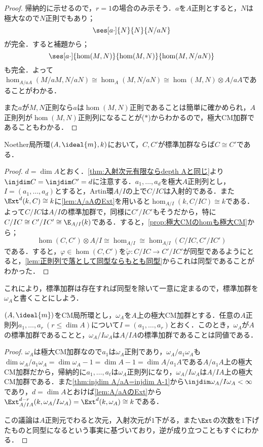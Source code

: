 \begin{proof}
	帰納的に示せるので，$r=1$の場合のみ示そう．$a$を$A$正則とすると，$N$は極大なので$N$正則でもあり；
	\[\ses[a\cdot]{N}{N}{N/aN}\]
	が完全．すると補題から；
	\[\ses[a\cdot]{\hom(M,N)}{\hom(M,N)}{\hom(M,N/aN)}\]
	も完全．よって$\hom_{A/aA}(M/aM,N/aN)\cong\hom_A(M,N/aN)\cong\hom(M,N)\otimes A/aA$であることがわかる．
	
	また$a$が$M,N$正則なら$a$は$\hom(M,N)$正則であることは簡単に確かめられ，$A$正則列が$\hom(M,N)$正則列になることが($\ast$)からわかるので，極大CM加群であることもわかる．
\end{proof}

\begin{thm}
	Noether局所環$(A,\ideal{m},k)$において，$C,C'$が標準加群ならば$C\cong C'$である．
\end{thm}

\begin{proof}
	$d=\dim A$とおく．\ref{thm:入射次元有限ならdepth Aと同じ}より$\injdim C=\injdim C'=d$に注意する．$a_1,\dots,a_d$を極大$A$正則列とし，$I=(a_1,\dots,a_d)$とすると，Artin環$A/I$の上で$C/IC$は入射的である．また$\Ext^d(k,C)\cong k$に\ref{lem:A/aAのExt}を用いると$\hom_{A/I}(k,C/IC)\cong k$である．よって$C/IC$は$A/I$の標準加群で，同様に$C'/IC'$もそうだから，特に$C/IC\cong C'/IC'\cong\E_{A/I}(k)$である．すると，\ref{prop:極大CMのhomも極大CM}から；
	\[\hom(C,C')\otimes A/I\cong\hom_{A/I}\cong\hom_{A/I}(C/IC,C'/IC')\]
	である．すると，$\varphi\in\hom(C,C')$を$\widetilde{\varphi}:C/IC\to C'/IC'$が同型であるようにとると，\ref{lem:正則列で落として同型ならもとも同型}からこれは同型であることがわかった．
\end{proof}

これにより，標準加群は存在すれば同型を除いて一意に定まるので，標準加群を$\omega_A$と書くことにしよう．

\begin{prop}\label{prop:標準加群を正則列で割る}
	$(A,\ideal{m})$をCM局所環とし，$\omega_A$を$A$上の極大CM加群とする．任意の$A$正則列$a_1,\dots,a_r~(r\leq\dim A)$について$I=(a_1,\dots,a_r)$とおく．このとき，$\omega_A$が$A$の標準加群であることと，$\omega_A/I\omega_A$は$A/IA$の標準加群であることは同値である．
\end{prop}

\begin{proof}
	$\omega_A$は極大CM加群なので$a_1$は$\omega_A$正則であり，$\omega_A/a_1\omega_A$も$\dim \omega_A/a_1\omega_A=\dim \omega_A-1=\dim A-1=\dim A/a_1A$である$A/a_1A$上の極大CM加群だから，帰納的に$a_1,\dots,a_t$は$\omega_A$正則列になり，$\omega_A/I\omega_A$は$A/IA$上の極大CM加群である．また\ref{thm:injdim A/aA=injdim A-1}から$\injdim \omega_A/I\omega_A<\infty$であり，$d=\dim A$とおけば\ref{lem:A/aAのExt}から$\Ext^{d-r}_{A/IA}(k,\omega_A/I\omega_A)=\Ext^d(k,\omega_A)\cong k$である．
	
	この議論は$A$正則元でわると次元，入射次元が$1$下がる，また$\Ext$の次数を$1$下げたものと同型になるという事実に基づいており，逆が成り立つこともすぐにわかる．
\end{proof}

